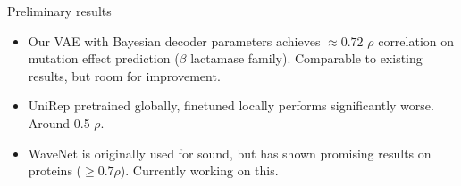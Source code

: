 \documentclass[dvipsnames]{beamer}
\begin{document}
\begin{frame}{Preliminary results}
    \begin{itemize}
        \item Our VAE with Bayesian decoder parameters achieves $\approx 0.72$ $\rho$ correlation on mutation effect prediction ($\beta$ lactamase family). Comparable to existing results, but room for improvement.
        \item UniRep pretrained globally, finetuned locally performs significantly worse. Around 0.5 $\rho$.
        \item WaveNet is originally used for sound, but has shown promising results on proteins ($\geq 0.7 \rho$). Currently working on this.
    \end{itemize}
\end{frame}
\end{document}
